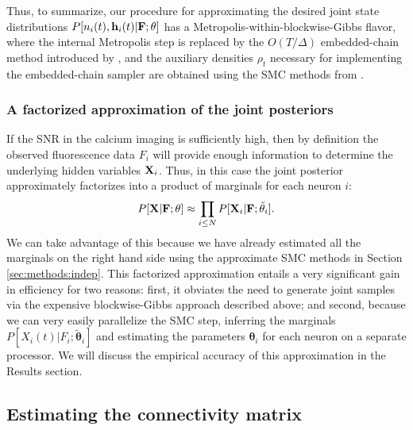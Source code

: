 \documentclass[aoas,preprint]{imsart}
\newcommand{\bth}{\mathbf{\theta}}
\newcommand{\bF}{{\bf F}}
\newcommand{\bX}{{\bf X}}
\newcommand{\bh}{\mathbf{h}}
\newcommand{\tbth}{\tilde{\bth}}
\begin{document}
Thus, to summarize, our procedure for approximating the desired joint
state distributions $P[n_i(t), \bh_i(t) | \bF;\bth]$ has a
Metropolis-within-blockwise-Gibbs flavor, where the internal
Metropolis step is replaced by the $O(T/\Delta)$ embedded-chain method
introduced by \cite{NBR03}, and the auxiliary densities $\rho_t$
necessary for implementing the embedded-chain sampler are obtained
using the SMC methods from \cite{Vogelstein2009}.

\subsubsection{A factorized approximation of the joint posteriors}
\label{sec:cheaper-high-snr}

If the SNR in the calcium imaging is sufficiently high, then by
definition the observed fluorescence data $F_i$ will provide enough
information to determine the underlying hidden variables
$\bX_i$. Thus, in this case the joint posterior approximately
factorizes into a product of marginals for each neuron $i$:
\begin{equation} \label{eqn:indep_approx}
  P[\bX|\bF;\bth] \approx \prod_{i\leq N} P[\bX_i | \bF; \tbth_i].
\end{equation}
We can take advantage of this because we have already estimated all
the marginals on the right hand side using the approximate SMC methods
in Section \ref{sec:methods:indep}.  This factorized approximation
entails a very significant gain in efficiency for two reasons: first,
it obviates the need to generate joint samples via the expensive
blockwise-Gibbs approach described above; and second, because we can
very easily parallelize the SMC step, inferring the marginals
$P[X_i(t) | F_i; \tbth_i]$ and estimating the parameters $\bth_i$ for
each neuron on a separate processor. We will discuss the empirical
accuracy of this approximation in the Results section.

\subsection{Estimating the connectivity matrix} \label{sec:methods:parameters HMM}
\end{document}
